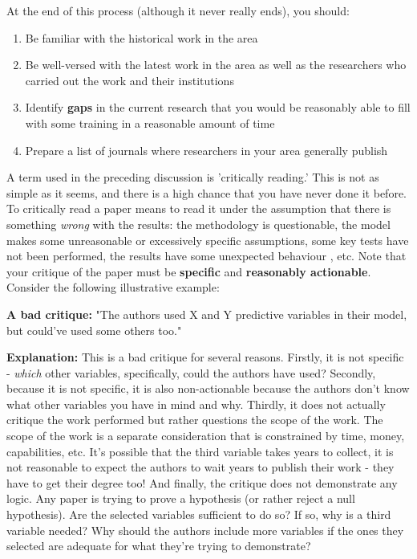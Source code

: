 \documentclass[12pt]{article}
\begin{document}
At the end of this process (although it never really ends), you should:

\begin{enumerate}
	\item Be familiar with the historical work in the area
	\item Be well-versed with the latest work in the area as well as the researchers who carried out the work and their institutions
	\item Identify \textbf{gaps} in the current research that you would be reasonably able to fill with some training in a reasonable amount of time
	\item Prepare a list of journals where researchers in your area generally publish
\end{enumerate}

A term used in the preceding discussion is 'critically reading.' This is not as simple as it seems, and there is a high chance that you have never done it before. To critically read a paper means to read it under the assumption that there is something \textit{wrong} with the results: the methodology is questionable, the model makes some unreasonable or excessively specific assumptions, some key tests have not been performed, the results have some unexpected behaviour , etc. Note that your critique of the paper must be \textbf{specific} and \textbf{reasonably actionable}. Consider the following illustrative example:

\textbf{A bad critique:} "The authors used X and Y predictive variables in their model, but could've used some others too."

\textbf{Explanation:} This is a bad critique for several reasons. Firstly, it is not specific - \textit{which} other variables, specifically, could the authors have used? Secondly, because it is not specific, it is also non-actionable because the authors don't know what other variables you have in mind and why. Thirdly, it does not actually critique the work performed but rather questions the scope of the work. The scope of the work is a separate consideration that is constrained by time, money, capabilities, etc. It's possible that the third variable takes years to collect, it is not reasonable to expect the authors to wait years to publish their work - they have to get their degree too! And finally, the critique does not demonstrate any logic. Any paper is trying to prove a hypothesis (or rather reject a null hypothesis). Are the selected variables sufficient to do so? If so, why is a third variable needed? Why should the authors include more variables if the ones they selected are adequate for what they're trying to demonstrate?
\end{document}
